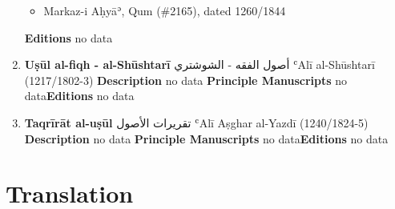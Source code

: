 \documentclass{article}
\begin{document}
\begin{enumerate}
\begin{itemize}
    \item Markaz-i Aḥyāʾ, Qum (\#2165), dated 1260/1844
    \end{itemize}
\textbf{Editions}
\newline
no data\newline
      \item \textbf{Uṣūl al-fiqh - al-Shūshtarī}
        \newline
        \textarabic{أصول الفقه - الشوشتري}
        \newline
        ʿAlī al-Shūshtarī
        \newline
        (1217/1802-3)
        \newline
        \newline
        \textbf{Description}
        \newline	
        no data
        \newline
        \newline
    \textbf{Principle Manuscripts}
\newline
no data\newline\textbf{Editions}
\newline
no data\newline
      \item \textbf{Taqrīrāt al-uṣūl}
        \newline
        \textarabic{تقريرات الأصول}
        \newline
        ʿAlī Aṣghar al-Yazdī
        \newline
        (1240/1824-5)
        \newline
        \newline
        \textbf{Description}
        \newline	
        no data
        \newline
        \newline
    \textbf{Principle Manuscripts}
\newline
no data\newline\textbf{Editions}
\newline
no data\newline\end{enumerate}\section{ Translation}
\end{document}
